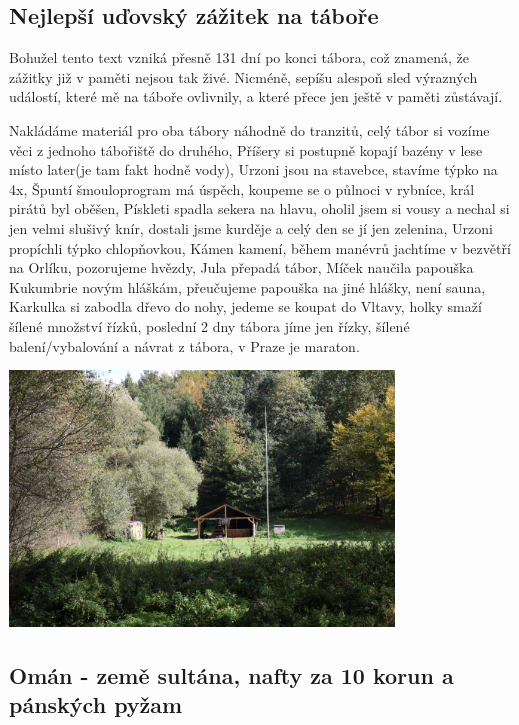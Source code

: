 \subsection*{Nejlepší uďovský zážitek na táboře}
\label{sub:nejlepší_uďovský_zážitek_na_táboře}

Bohužel tento text vzniká přesně 131 dní po konci tábora, což znamená, že zážitky již v paměti nejsou tak živé. Nicméně, sepíšu alespoň sled výrazných událostí, které mě na táboře ovlivnily, a které přece jen ještě v paměti zůstávají.

Nakládáme materiál pro oba tábory náhodně do tranzitů, celý tábor si vozíme věci z jednoho tábořiště do druhého, Příšery si postupně kopají bazény v lese místo later(je tam fakt hodně vody), Urzoni jsou na stavebce, stavíme týpko na 4x, Špuntí šmouloprogram má úspěch, koupeme se o půlnoci v rybníce, král pirátů byl oběšen, Pískleti spadla sekera na hlavu, oholil jsem si vousy a nechal si jen velmi slušivý knír, dostali jsme kurděje a celý den se jí jen zelenina, Urzoni propíchli týpko chlopňovkou, Kámen kamení, během manévrů jachtíme v bezvětří na Orlíku, pozorujeme hvězdy, Jula přepadá tábor, Míček naučila papouška Kukumbrie novým hláškám, přeučujeme papouška na jiné hlášky, není sauna, Karkulka si zabodla dřevo do nohy, jedeme se koupat do Vltavy, holky smaží šílené množství řízků, poslední 2 dny tábora jíme jen řízky, šílené balení/vybalování a návrat z tábora, v Praze je maraton. 

\begin{center}

\includegraphics[width=10.2cm]{img/udo_clanky/hledanitaboriste.JPG}

\end{center}


\clearpage


\subsection *{Omán - země sultána, nafty za 10 korun a pánských pyžam}
\label{sub:omán_-_země sultána_ nafty_za_10_korun_a_pánských_pyžam}

